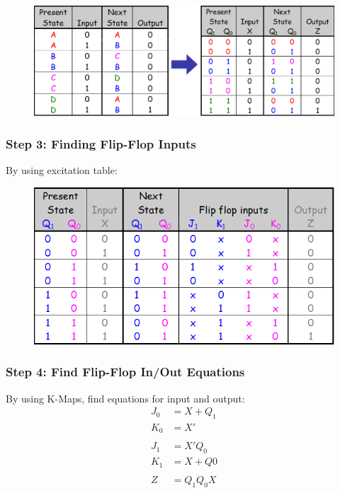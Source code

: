 \begin{figure}[H]
  \centering
  \includegraphics[width=\linewidth]{img/desing-example-state-table-2.png}
\end{figure}

\subsubsection{Step 3: Finding Flip-Flop Inputs}
\label{subsubsec:step3-finding-ff-inputs}

By using excitation table:
\begin{figure}[H]
  \centering
  \includegraphics[width=\linewidth]{img/desing-example-state-table-3.png}
\end{figure}

\subsubsection{Step 4: Find Flip-Flop In/Out Equations}
\label{subsubsec:step4-find-ff-io-equations}

\noindent By using K-Maps, find equations for input and output:
\begin{align*}
	J_0 &= X + Q_1\\
	K_0 &= X'\\
  &\\
  J_1 &= X'Q_0\\
	K_1 &= X + Q0\\
  &\\
	Z &= Q_1Q_0X
\end{align*}

